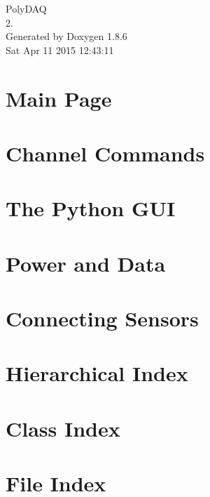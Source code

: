 \documentclass[twoside]{book}
\newcommand{\clearemptydoublepage}{%
  \newpage{\pagestyle{empty}\cleardoublepage}%
}
\begin{document}
\hypersetup{pageanchor=false}
\begin{titlepage}
\vspace*{7cm}
\begin{center}%
{\Large Poly\-D\-A\-Q \\[1ex]\large 2. }\\
\vspace*{1cm}
{\large Generated by Doxygen 1.8.6}\\
\vspace*{0.5cm}
{\small Sat Apr 11 2015 12:43:11}\\
\end{center}
\end{titlepage}
\clearemptydoublepage
\tableofcontents
\clearemptydoublepage
{}
\hypersetup{pageanchor=true}

\chapter{Main Page}
\label{index}\hypertarget{index}{}
\chapter{Channel Commands}
\label{pd_channels}
\hypertarget{pd_channels}{}

\chapter{The Python G\-U\-I}
\label{pd_py_gui}
\hypertarget{pd_py_gui}{}

\chapter{Power and Data}
\label{pd_setup}
\hypertarget{pd_setup}{}

\chapter{Connecting Sensors}
\label{pd_sensors}
\hypertarget{pd_sensors}{}

\chapter{Hierarchical Index}

\chapter{Class Index}

\chapter{File Index}

\end{document}
